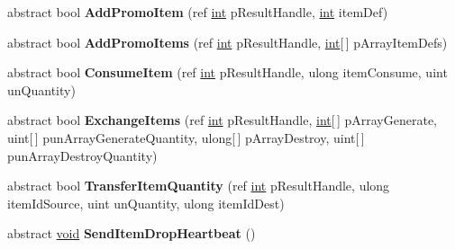 \begin{DoxyCompactItemize}
\item 
\hypertarget{classValve_1_1Steamworks_1_1ISteamInventory_a0b3533ad6195af2bfff5c0ce5845aee1}{}abstract bool {\bfseries Add\+Promo\+Item} (ref \hyperlink{SDL__thread_8h_a6a64f9be4433e4de6e2f2f548cf3c08e}{int} p\+Result\+Handle, \hyperlink{SDL__thread_8h_a6a64f9be4433e4de6e2f2f548cf3c08e}{int} item\+Def)\label{classValve_1_1Steamworks_1_1ISteamInventory_a0b3533ad6195af2bfff5c0ce5845aee1}

\item 
\hypertarget{classValve_1_1Steamworks_1_1ISteamInventory_adfac90a327c23bb410251e0a3072ae65}{}abstract bool {\bfseries Add\+Promo\+Items} (ref \hyperlink{SDL__thread_8h_a6a64f9be4433e4de6e2f2f548cf3c08e}{int} p\+Result\+Handle, \hyperlink{SDL__thread_8h_a6a64f9be4433e4de6e2f2f548cf3c08e}{int}\mbox{[}$\,$\mbox{]} p\+Array\+Item\+Defs)\label{classValve_1_1Steamworks_1_1ISteamInventory_adfac90a327c23bb410251e0a3072ae65}

\item 
\hypertarget{classValve_1_1Steamworks_1_1ISteamInventory_aa1bbee3e122211c0fbcc38a670302cfc}{}abstract bool {\bfseries Consume\+Item} (ref \hyperlink{SDL__thread_8h_a6a64f9be4433e4de6e2f2f548cf3c08e}{int} p\+Result\+Handle, ulong item\+Consume, uint un\+Quantity)\label{classValve_1_1Steamworks_1_1ISteamInventory_aa1bbee3e122211c0fbcc38a670302cfc}

\item 
\hypertarget{classValve_1_1Steamworks_1_1ISteamInventory_a4eca29ea3864941b825210fc434c2ee2}{}abstract bool {\bfseries Exchange\+Items} (ref \hyperlink{SDL__thread_8h_a6a64f9be4433e4de6e2f2f548cf3c08e}{int} p\+Result\+Handle, \hyperlink{SDL__thread_8h_a6a64f9be4433e4de6e2f2f548cf3c08e}{int}\mbox{[}$\,$\mbox{]} p\+Array\+Generate, uint\mbox{[}$\,$\mbox{]} pun\+Array\+Generate\+Quantity, ulong\mbox{[}$\,$\mbox{]} p\+Array\+Destroy, uint\mbox{[}$\,$\mbox{]} pun\+Array\+Destroy\+Quantity)\label{classValve_1_1Steamworks_1_1ISteamInventory_a4eca29ea3864941b825210fc434c2ee2}

\item 
\hypertarget{classValve_1_1Steamworks_1_1ISteamInventory_a6e441bcfc7be7f59d496b8f024257243}{}abstract bool {\bfseries Transfer\+Item\+Quantity} (ref \hyperlink{SDL__thread_8h_a6a64f9be4433e4de6e2f2f548cf3c08e}{int} p\+Result\+Handle, ulong item\+Id\+Source, uint un\+Quantity, ulong item\+Id\+Dest)\label{classValve_1_1Steamworks_1_1ISteamInventory_a6e441bcfc7be7f59d496b8f024257243}

\item 
\hypertarget{classValve_1_1Steamworks_1_1ISteamInventory_af631ad216b43fc6da71113939e2e0fb6}{}abstract \hyperlink{SDL__audio_8h_a52835ae37c4bb905b903cbaf5d04b05f}{void} {\bfseries Send\+Item\+Drop\+Heartbeat} ()\label{classValve_1_1Steamworks_1_1ISteamInventory_af631ad216b43fc6da71113939e2e0fb6}


\end{DoxyCompactItemize}
